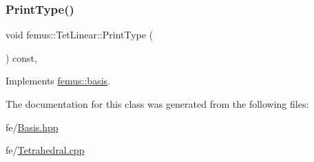 \subsubsection{\texorpdfstring{Print\+Type()}{PrintType()}}
{\footnotesize\ttfamily void femus\+::\+Tet\+Linear\+::\+Print\+Type (\begin{DoxyParamCaption}{ }\end{DoxyParamCaption}) const\hspace{0.3cm}{\ttfamily [inline]}, {\ttfamily [virtual]}}



Implements \mbox{\hyperlink{classfemus_1_1basis_abbae7bf8f31ec5793c911bc6d4ea0572}{femus\+::basis}}.



The documentation for this class was generated from the following files\+:\begin{DoxyCompactItemize}
\item 
fe/\mbox{\hyperlink{_basis_8hpp}{Basis.\+hpp}}\item 
fe/\mbox{\hyperlink{_tetrahedral_8cpp}{Tetrahedral.\+cpp}}\end{DoxyCompactItemize}
